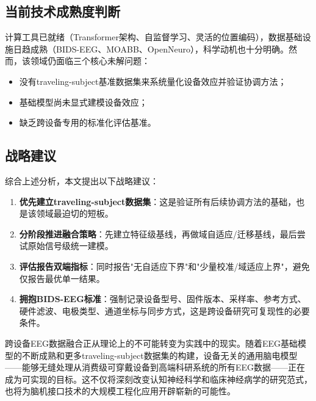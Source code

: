 \documentclass[12pt, a4paper]{article}
\begin{document}
\subsection{当前技术成熟度判断}

计算工具已就绪（Transformer架构、自监督学习、灵活的位置编码），数据基础设施日趋成熟（BIDS-EEG\citep{Pernet2019BIDS}、MOABB\citep{Chevallier2024MOABB}、OpenNeuro\citep{Markiewicz2021OpenNeuro}），科学动机也十分明确。然而，该领域仍面临三个核心未解问题：

\begin{itemize}
  \item 没有traveling-subject基准数据集来系统量化设备效应并验证协调方法；
  \item 基础模型尚未显式建模设备效应；
  \item 缺乏跨设备专用的标准化评估基准。
\end{itemize}

\subsection{战略建议}

综合上述分析，本文提出以下战略建议：

\begin{enumerate}[leftmargin=2em]
  \item \textbf{优先建立traveling-subject数据集}：这是验证所有后续协调方法的基础，也是该领域最迫切的短板。
  \item \textbf{分阶段推进融合策略}：先建立特征级基线，再做域自适应/迁移基线，最后尝试原始信号级统一建模。
  \item \textbf{评估报告双端指标}：同时报告"无自适应下界"和"少量校准/域适应上界"，避免仅报告最优单一结果。
  \item \textbf{拥抱BIDS-EEG标准}：强制记录设备型号、固件版本、采样率、参考方式、硬件滤波、电极类型、通道坐标与同步方式，这是跨设备研究可复现性的必要条件。
\end{enumerate}

跨设备EEG数据融合正从理论上的不可能转变为实践中的现实。随着EEG基础模型的不断成熟和更多traveling-subject数据集的构建，设备无关的通用脑电模型——能够无缝处理从消费级可穿戴设备到高端科研系统的所有EEG数据——正在成为可实现的目标。这不仅将深刻改变认知神经科学和临床神经病学的研究范式，也将为脑机接口技术的大规模工程化应用开辟崭新的可能性。


\end{document}
